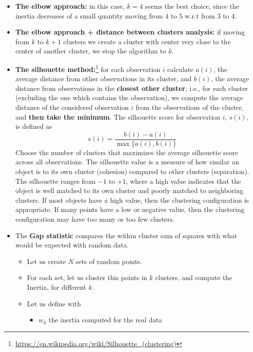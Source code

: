 \begin{itemize}
    \item \textbf{The elbow approach:} in this case, $k=4$ seems the best choice, since the inertia decreases of a small quantity moving from $4$ to $5$ w.r.t from $3$ to $4$.
    \item \textbf{The elbow approach + distance between clusters analysis:} if moving from $k$ to $k+1$ clusters we create a cluster with center very close to the center of another cluster, we stop the algorithm to $k$.
    \item \textbf{The silhouette method:}\footnote{\url{https://en.wikipedia.org/wiki/Silhouette_(clustering)}} for each observation $i$ calculate $a(i)$, the average distance from other observations in its cluster, and $b(i)$, the average distance from observations in the \textbf{closest other cluster}, i.e., for each cluster (excluding the one which contains the observation), we compute the average distance of the considered observation $i$ from the observations of the cluster, and \textbf{then take the minimum}. The silhouette score for observation $i$, $s(i)$, is defined as
    \begin{equation*}
        s(i) =\frac{b(i) -a(i)}{\max\{a(i),b(i)\}}
    \end{equation*}
    Choose the number of clusters that maximizes the average silhouette score across all observations.
    The silhouette value is a measure of how similar an object is to its own cluster (cohesion) compared to other clusters (separation). The silhouette ranges from $-1$ to $+1$, where a high value indicates that the object is well matched to its own cluster and poorly matched to neighboring clusters. If most objects have a high value, then the clustering configuration is appropriate. If many points have a low or negative value, then the clustering configuration may have too many or too few clusters.
    \item The \textbf{Gap statistic} compares the within cluster sum of squares with what would be expected with random data.
    \begin{itemize}
        \item Let us create $N$ sets of random points.
        \item For each set, let us cluster this points in $k$ clusters, and compute the Inertia, for different $k$.
        \item Let us define with
        \begin{itemize}
            \item $w_{k}$ the inertia computed for the real data

\end{itemize}
\end{itemize}
\end{itemize}
